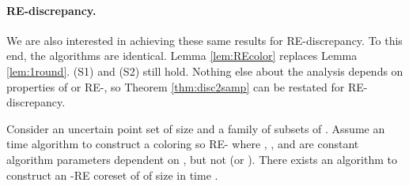 \documentclass[11pt]{myclass}
\newcommand{\RE}{\textsf{RE}\xspace}
\newcommand{\Paragraph}[1]{\paragraph{\sffamily\textbf{#1.}}}
\begin{document}
\Paragraph{\RE-discrepancy}
We are also interested in achieving these same results for \RE-discrepancy.  To this end, the algorithms are identical.  Lemma \ref{lem:REcolor} replaces Lemma \ref{lem:1round}.  (S1) and (S2) still hold.  Nothing else about the analysis depends on properties of  or \RE-, so Theorem \ref{thm:disc2samp} can be restated for \RE-discrepancy.  


\begin{theorem}
Consider an uncertain point set  of size  and a family of subsets  of .
Assume an  time algorithm to construct a coloring  so \RE- where , , and  are constant algorithm parameters dependent on , but not  (or ).  
There exists an algorithm to construct an -\RE coreset of  of size  in time 
.  
\label{thm:RE-disc2samp}
\end{theorem}
\end{document}
